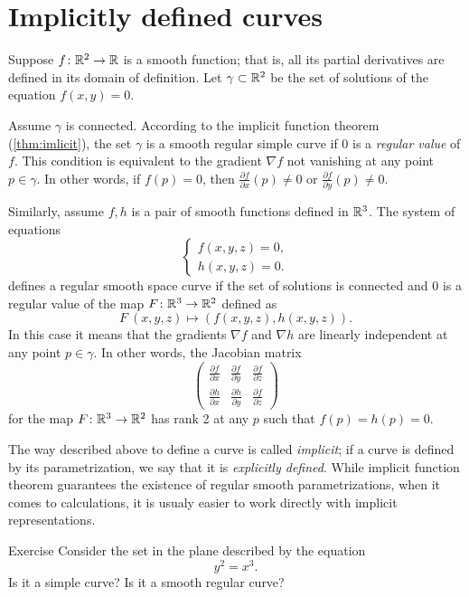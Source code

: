 \section*{Implicitly defined curves}

Suppose $f\colon\mathbb{R}^2\to \mathbb{R}$ is a smooth function; 
that is, all its partial derivatives are defined in its domain of definition.
Let $\gamma\subset \mathbb{R}^2$ be the set of solutions of the equation $f(x,y)=0$.

Assume $\gamma$ is connected.
According to the implicit function theorem (\ref{thm:imlicit}), the set $\gamma$ is a smooth regular simple curve if $0$ is a \emph{regular value} of $f$.
This condition is equivalent to the gradient $\nabla f$ not vanishing at any point $p\in \gamma$.
In other words, if $f(p)=0$, then  $\tfrac{\partial f}{\partial x}(p)\ne 0$ or $\tfrac{\partial f}{\partial y}(p)\ne 0$.

Similarly, assume $f,h$ is a pair of smooth functions defined in $\mathbb{R}^3$.
The system of equations
\[\begin{cases}
   f(x,y,z)=0,
   \\
   h(x,y,z)=0.
  \end{cases}
\]
defines a regular smooth space curve if the set of solutions is connected and $0$ is a regular value of the map $F\colon\mathbb{R}^3\to\mathbb{R}^2$ defined as
\[F\:(x,y,z)\mapsto (f(x,y,z),h(x,y,z)).\]
In this case it means that the gradients $\nabla f$ and $\nabla h$ are linearly independent at any point $p\in \gamma$.
In other words, the Jacobian matrix
\[
\begin{pmatrix}
\tfrac{\partial f}{\partial x}&\tfrac{\partial f}{\partial y}&\tfrac{\partial f}{\partial z}\\
\tfrac{\partial h}{\partial x}&\tfrac{\partial h}{\partial y}&\tfrac{\partial f}{\partial z}
\end{pmatrix}
\]
for the map $F\colon\mathbb{R}^3\to\mathbb{R}^2$ has rank 2 at any $p$ such that $f(p)=h(p)=0$.

The way described above to define a curve is called \emph{implicit};
if a curve is defined by its parametrization, we say that it is \emph{explicitly defined}.
While implicit function theorem guarantees the existence of regular smooth parametrizations,
when it comes to calculations, it is usualy easier to work directly with implicit representations. 

\begin{thm}{Exercise}
Consider the set in the plane described by the equation
\[y^2=x^3.\]
Is it a simple curve? Is it a smooth regular curve?
\end{thm}

